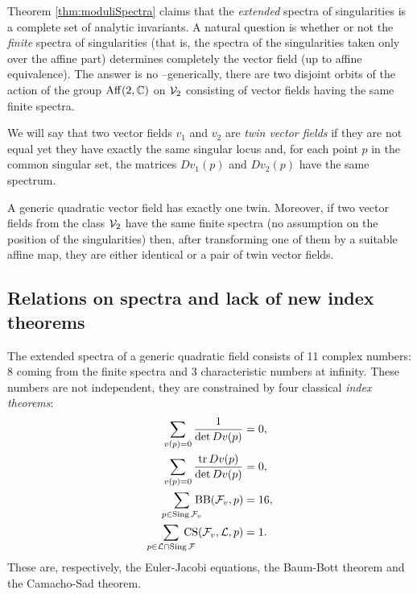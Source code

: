 \documentclass[phd,tocprelim]{cornell}
\begin{document}
Theorem \ref{thm:moduliSpectra} claims that the \textit{extended} spectra of singularities is a complete set of analytic invariants. A natural question is whether or not the \textit{finite} spectra of singularities (that is, the spectra of the singularities taken only over the affine part) determines completely the vector field (up to affine equivalence). The answer is no --generically, there are two disjoint orbits of the action of the group $\operatorname{Aff}({2},{\mathbb{C}})$ on $\mathcal{V}_2$ consisting of vector fields having the same finite spectra.

\begin{definition}\label{def:twins}
We will say that two vector fields $v_1$ and $v_2$ are \emph{twin vector fields} if they are not equal yet they have exactly the same singular locus and, for each point $p$ in the common singular set, the matrices $Dv_1(p)$ and $Dv_2(p)$ have the same spectrum.
\end{definition}

\begin{theorem}\label{thm:twins}
 A generic quadratic vector field has exactly one twin. Moreover, if two vector fields from the class $\mathcal{V}_2$ have the same finite spectra (no assumption on the position of the singularities) then, after transforming one of them by a suitable affine map, they are either identical or a pair of twin vector fields.
\end{theorem}


\subsection{Relations on spectra and lack of new index theorems}

The extended spectra of a generic quadratic field consists of 11 complex numbers: 8 coming from the finite spectra and 3 characteristic numbers at infinity. These numbers are not independent, they are constrained by four classical \textit{index theorems}: 
\begin{align} 
 \sum_{v(p)=0}\frac{1}{\det Dv(p)} &= 0, \label{eq:firstEJ1}\\
 \sum_{v(p)=0}\frac{\tr Dv(p) }{\det Dv(p)} &= 0, \label{eq:firstEJ2}\\
 \sum_{p\in\operatorname{Sing }\F_v} \hspace{-8pt}\BBindex{\F_v}{p} &= 16, \label{eq:firstBB}\\
 \sum_{p\in \mathcal{L}\cap\operatorname{Sing}\F}\hspace{-12pt}\CSindex{\F_v}{\mathcal{L}}{p} &= 1. \label{eq:CS}
\end{align}
These are, respectively, the Euler-Jacobi equations, the Baum-Bott theorem and the Camacho-Sad theorem. 
\end{document}
